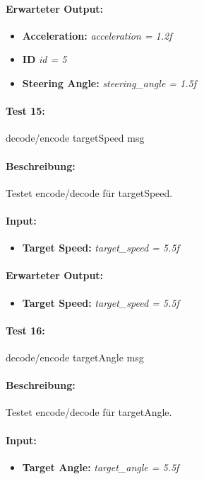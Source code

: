 \documentclass[a4paper, 12pt, titlepage]{scrartcl}
\begin{document}
{			\paragraph{Erwarteter Output:}
			\begin{itemize} \itemsep-0.5em
				\item \textbf{Acceleration:} \emph{acceleration = 1.2f}
				\item \textbf{ID} \emph{id = 5}
				\item \textbf{Steering Angle:} \emph{steering\_angle = 1.5f}
			\end{itemize}

			\paragraph{Test 15:}{decode/encode targetSpeed msg}
			\paragraph{Beschreibung:} Testet encode/decode für targetSpeed.
			\paragraph{Input:}
			\begin{itemize} \itemsep-0.5em
				\item \textbf{Target Speed:} \emph{target\_speed = 5.5f}
			\end{itemize}
			\paragraph{Erwarteter Output:}
			\begin{itemize} \itemsep-0.5em
				\item \textbf{Target Speed:} \emph{target\_speed = 5.5f}
			\end{itemize}

			\paragraph{Test 16:}{decode/encode targetAngle msg}
			\paragraph{Beschreibung:} Testet encode/decode für targetAngle.
			\paragraph{Input:}
			\begin{itemize} \itemsep-0.5em
				\item \textbf{Target Angle:} \emph{target\_angle = 5.5f}
			\end{itemize}
}
\end{document}
